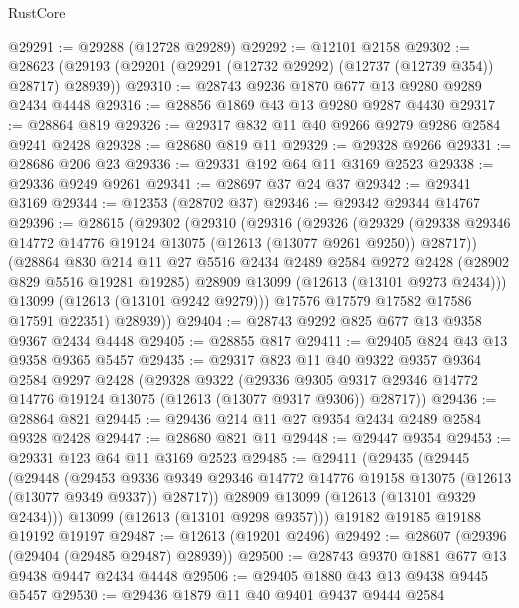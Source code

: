 \begin{lexlean}{RustCore}
\begin{coremodule}
@29291 := @29288 (@12728 @29289)
@29292 := @12101 @2158
@29302 := @28623 (@29193 (@29201 (@29291 (@12732 @29292) (@12737 (@12739 @354)) @28717) @28939))
@29310 := @28743 @9236 @1870 @677 @13 @9280 @9289 @2434 @4448
@29316 := @28856 @1869 @43 @13 @9280 @9287 @4430
@29317 := @28864 @819
@29326 := @29317 @832 @11 @40 @9266 @9279 @9286 @2584 @9241 @2428
@29328 := @28680 @819 @11
@29329 := @29328 @9266
@29331 := @28686 @206 @23
@29336 := @29331 @192 @64 @11 @3169 @2523
@29338 := @29336 @9249 @9261
@29341 := @28697 @37 @24 @37
@29342 := @29341 @3169
@29344 := @12353 (@28702 @37)
@29346 := @29342 @29344 @14767
@29396 := @28615
    (@29302
      (@29310
        (@29316
          (@29326
            (@29329
              (@29338 @29346 @14772 @14776 @19124 @13075 (@12613 (@13077 @9261 @9250)) @28717))
            (@28864
              @830
              @214
              @11
              @27
              @5516
              @2434
              @2489
              @2584
              @9272
              @2428
              (@28902 @829 @5516 @19281 @19285)
              @28909
              @13099
              (@12613 (@13101 @9273 @2434)))
            @13099
            (@12613 (@13101 @9242 @9279)))
          @17576
          @17579
          @17582
          @17586
          @17591
          @22351)
        @28939))
@29404 := @28743 @9292 @825 @677 @13 @9358 @9367 @2434 @4448
@29405 := @28855 @817
@29411 := @29405 @824 @43 @13 @9358 @9365 @5457
@29435 := @29317
    @823
    @11
    @40
    @9322
    @9357
    @9364
    @2584
    @9297
    @2428
    (@29328
      @9322
      (@29336 @9305 @9317 @29346 @14772 @14776 @19124 @13075 (@12613 (@13077 @9317 @9306)) @28717))
@29436 := @28864 @821
@29445 := @29436 @214 @11 @27 @9354 @2434 @2489 @2584 @9328 @2428
@29447 := @28680 @821 @11
@29448 := @29447 @9354
@29453 := @29331 @123 @64 @11 @3169 @2523
@29485 := @29411
    (@29435
      (@29445
        (@29448
          (@29453
            @9336
            @9349
            @29346
            @14772
            @14776
            @19158
            @13075
            (@12613 (@13077 @9349 @9337))
            @28717))
        @28909
        @13099
        (@12613 (@13101 @9329 @2434)))
      @13099
      (@12613 (@13101 @9298 @9357)))
    @19182
    @19185
    @19188
    @19192
    @19197
@29487 := @12613 (@19201 @2496)
@29492 := @28607 (@29396 (@29404 (@29485 @29487) @28939))
@29500 := @28743 @9370 @1881 @677 @13 @9438 @9447 @2434 @4448
@29506 := @29405 @1880 @43 @13 @9438 @9445 @5457
@29530 := @29436
    @1879
    @11
    @40
    @9401
    @9437
    @9444
    @2584

\end{coremodule}
\end{lexlean}
